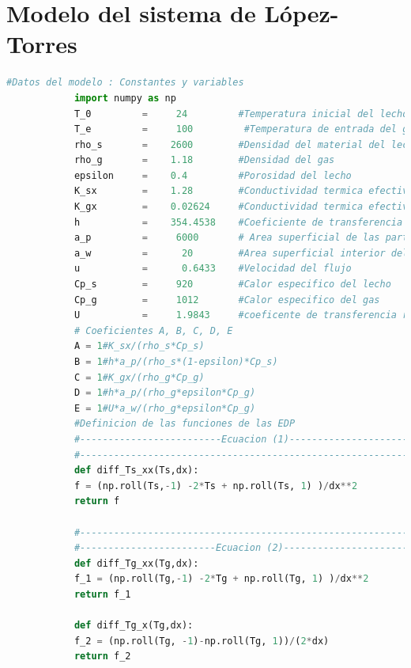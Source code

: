 \documentclass[12pt,letterpaper,final]{article}%
\begin{document}
	\section{Modelo del sistema de López-Torres}
	\label{Codigo2}
		\begin{lstlisting}[language=Python]
			#Datos del modelo : Constantes y variables
			import numpy as np
			T_0         =     24         #Temperatura inicial del lecho
			T_e         =     100         #Temperatura de entrada del gas
			rho_s       =    2600        #Densidad del material del lecho
			rho_g       =    1.18        #Densidad del gas
			epsilon     =    0.4         #Porosidad del lecho
			K_sx        =    1.28        #Conductividad termica efectiva del solido
			K_gx        =    0.02624     #Conductividad termica efectiva del gas
			h           =    354.4538    #Coeficiente de transferencia de calor
			a_p         =     6000       # Area superficial de las particulas por unidad de volumen
			a_w         =      20        #Area superficial interior del lecho
			u           =      0.6433    #Velocidad del flujo
			Cp_s        =     920        #Calor especifico del lecho
			Cp_g        =     1012       #Calor especifico del gas
			U           =     1.9843     #coeficente de transferencia referido al Área del lecho, entre el interior del lecho y el exterior
			# Coeficientes A, B, C, D, E
			A = 1#K_sx/(rho_s*Cp_s)
			B = 1#h*a_p/(rho_s*(1-epsilon)*Cp_s)
			C = 1#K_gx/(rho_g*Cp_g)
			D = 1#h*a_p/(rho_g*epsilon*Cp_g)
			E = 1#U*a_w/(rho_g*epsilon*Cp_g)  
			#Definicion de las funciones de las EDP
			#-------------------------Ecuacion (1)-----------------------------
			#------------------------------------------------------------------
			def diff_Ts_xx(Ts,dx):
			f = (np.roll(Ts,-1) -2*Ts + np.roll(Ts, 1) )/dx**2
			return f
			
			#-------------------------------------------------------------------
			#------------------------Ecuacion (2)-------------------------------
			def diff_Tg_xx(Tg,dx):
			f_1 = (np.roll(Tg,-1) -2*Tg + np.roll(Tg, 1) )/dx**2
			return f_1
			
			def diff_Tg_x(Tg,dx):
			f_2 = (np.roll(Tg, -1)-np.roll(Tg, 1))/(2*dx)
			return f_2
			

\end{lstlisting}
\end{document}

